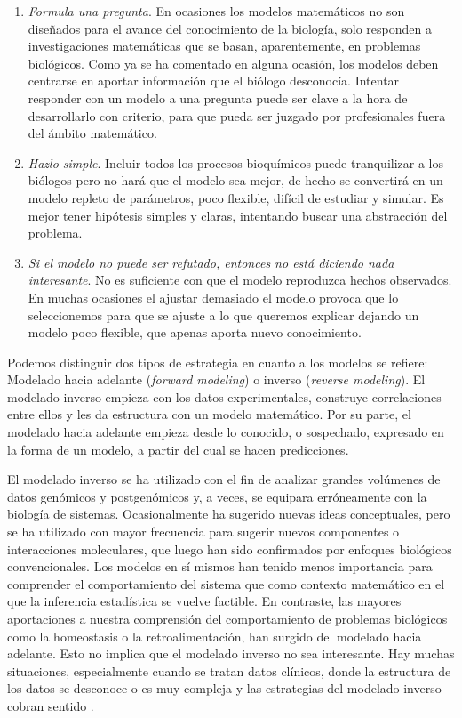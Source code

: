 \begin{enumerate}
	\item \textit{Formula una pregunta}. En ocasiones los modelos matemáticos no son diseñados para el avance del conocimiento de la biología, solo responden a investigaciones matemáticas que se basan, aparentemente, en problemas biológicos. Como ya se ha comentado en alguna ocasión, los modelos deben centrarse en aportar información que el biólogo desconocía. Intentar responder con un modelo a una pregunta puede ser clave a la hora de desarrollarlo con criterio, para que pueda ser juzgado por profesionales fuera del ámbito matemático. 
	
	\item \textit{Hazlo simple}. Incluir todos los procesos bioquímicos puede tranquilizar a los biólogos pero no hará que el modelo sea mejor, de hecho se convertirá en un modelo repleto de parámetros, poco flexible, difícil de estudiar y simular. Es mejor tener hipótesis simples y claras, intentando buscar una abstracción del problema.
	
	\item \textit{Si el modelo no puede ser refutado, entonces no está diciendo nada interesante}. No es suficiente con que el modelo reproduzca hechos observados. En muchas ocasiones el ajustar demasiado el modelo provoca que lo seleccionemos para que se ajuste a lo que queremos explicar dejando un modelo poco flexible, que apenas aporta nuevo conocimiento.
\end{enumerate}

Podemos distinguir dos tipos de estrategia en cuanto a los modelos se refiere: Modelado hacia adelante (\textit{forward modeling}) o inverso (\textit{reverse modeling}). El modelado inverso empieza con los datos experimentales, construye correlaciones entre ellos y les da estructura con un modelo matemático. Por su parte, el modelado hacia adelante empieza desde lo conocido, o sospechado, expresado en la forma de un modelo, a partir del cual se hacen predicciones. 

El modelado inverso se ha utilizado con el fin de analizar grandes volúmenes de datos genómicos y postgenómicos y, a veces, se equipara erróneamente con la biología de sistemas. Ocasionalmente ha sugerido nuevas ideas conceptuales, pero se ha utilizado con mayor frecuencia para sugerir nuevos componentes o interacciones moleculares, que luego han sido confirmados por enfoques biológicos convencionales. Los modelos en sí mismos han tenido menos importancia para comprender el comportamiento del sistema que como contexto matemático en el que la inferencia estadística se vuelve factible. En contraste, las mayores aportaciones a nuestra comprensión del comportamiento de problemas biológicos como la homeostasis o la retroalimentación, han surgido del modelado hacia adelante. Esto no implica que el modelado inverso no sea interesante. Hay muchas situaciones, especialmente cuando se tratan datos clínicos, donde la estructura de los datos se desconoce o es muy compleja y las estrategias del modelado inverso cobran sentido \citep{Gunawardena2014}. 

